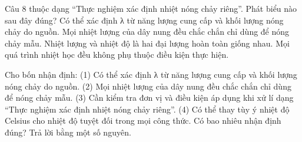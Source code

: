 \begin{ex}
Câu 8 thuộc dạng “Thực nghiệm xác định nhiệt nóng chảy riêng”. Phát biểu nào sau đây đúng?
\choice
{\True Có thể xác định λ từ năng lượng cung cấp và khối lượng nóng chảy do nguồn.}
{Mọi nhiệt lượng của dây nung đều chắc chắn chỉ dùng để nóng chảy mẫu.}
{Nhiệt lượng và nhiệt độ là hai đại lượng hoàn toàn giống nhau.}
{Mọi quá trình nhiệt học đều không phụ thuộc điều kiện thực hiện.}
\end{ex}

\begin{ex}
Cho bốn nhận định: (1) Có thể xác định λ từ năng lượng cung cấp và khối lượng nóng chảy do nguồn. (2) Mọi nhiệt lượng của dây nung đều chắc chắn chỉ dùng để nóng chảy mẫu. (3) Cần kiểm tra đơn vị và điều kiện áp dụng khi xử lí dạng “Thực nghiệm xác định nhiệt nóng chảy riêng”. (4) Có thể thay tùy ý nhiệt độ Celsius cho nhiệt độ tuyệt đối trong mọi công thức. Có bao nhiêu nhận định đúng? Trả lời bằng một số nguyên.
\end{ex}

